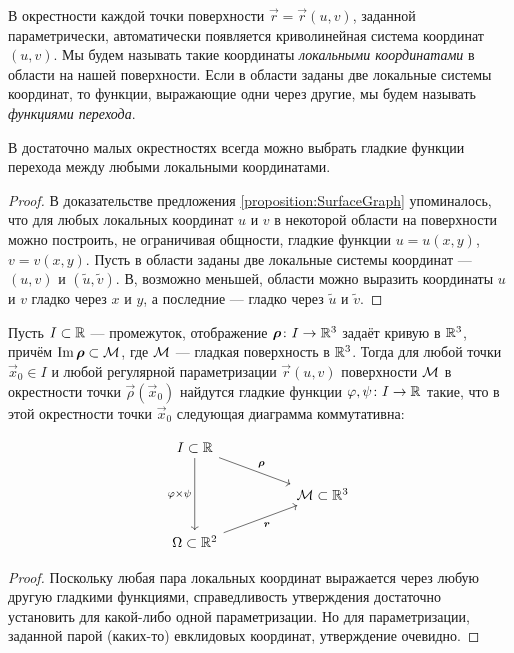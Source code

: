 В окрестности каждой точки поверхности $\vec{r} = \vec{r}(u, v)$, заданной параметрически, автоматически появляется криволинейная система координат $(u, v)$. Мы будем называть такие координаты \textit{локальными координатами} в области на нашей поверхности. Если в области заданы две локальные системы координат, то функции, выражающие одни через другие, мы будем называть \textit{функциями перехода}.

\begin{lemma} \label{lemma:SmoothLocal}
	В достаточно малых окрестностях всегда можно выбрать гладкие функции перехода между любыми локальными координатами.
\end{lemma}

\begin{proof}
	В доказательстве предложения \ref{proposition:SurfaceGraph} упоминалось, что для любых локальных координат $u$ и $v$ в некоторой области на поверхности можно построить, не ограничивая общности, гладкие функции $u = u(x, y)$, $v = v(x, y)$. Пусть в области заданы две локальные системы координат --- $(u, v)$ и $(\widetilde{u}, \widetilde{v})$. В, возможно меньшей, области можно выразить координаты $u$ и $v$ гладко через $x$ и $y$, а последние --- гладко через $\widetilde{u}$ и $\widetilde{v}$.
\end{proof}

\begin{corollary} \label{corollary:CurveOnSurface}
	Пусть $I \subset \mathbb{R}$ --- промежуток, отображение $\boldsymbol{\rho}\colon I \to \mathbb{R}^3$ задаёт кривую в $\mathbb{R}^3$, причём $\operatorname{Im}\boldsymbol{\rho} \subset \mathcal{M}$, где $\mathcal{M}$ --- гладкая поверхность в $\mathbb{R}^3$. Тогда для любой точки $\vec{x}_0 \in I$ и любой регулярной параметризации $\vec{r}(u, v)$ поверхности $\mathcal{M}$ в окрестности точки $\vec{\rho}(\vec{x}_0)$ найдутся гладкие функции $\varphi, \psi\colon I \to \mathbb{R}$ такие, что в этой окрестности точки $\vec{x}_0$ следующая диаграмма коммутативна:

	\[\begin{tikzcd}
			{I \subset \R} \\
			&& {\mathcal{M} \subset\R^3} \\
			{\Omega \subset \R^2}
			\arrow["\vec{\rho}", from=1-1, to=2-3]
			\arrow["{\varphi \times \psi}"', from=1-1, to=3-1]
			\arrow["{\boldsymbol{r}}"', from=3-1, to=2-3]
	\end{tikzcd}\]
\end{corollary}

\begin{proof}
	Поскольку любая пара локальных координат выражается через любую другую гладкими функциями, справедливость утверждения достаточно установить для какой-либо одной параметризации. Но для параметризации, заданной парой (каких-то) евклидовых координат, утверждение очевидно.
\end{proof}

